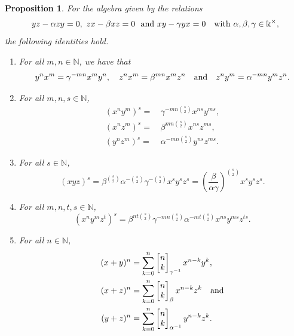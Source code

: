\documentclass{amsart}
\newtheorem{proposition}[theorem]{Proposition}
\theoremstyle{definition}
\theoremstyle{remark}
\numberwithin{equation}{section}
\begin{document}
\begin{proposition}\label{Case(1)}
For the algebra given by the relations
$$
yz - \alpha zy = 0,\ zx - \beta xz = 0\ \, \, {\rm and} \, \, xy - \gamma yx = 0 \quad {\rm with} \, \, \alpha, \beta, \gamma\in \Bbbk^{\times}, 
$$
the following identities hold.
\begin{enumerate}
\item [\rm (1)] For all $m, n\in\mathbb{N}$, we have that
\[
y^n x^m = \gamma^{-mn}x^m y^n, \quad
z^n x^m = \beta^{mn}x^m z^n \quad {\rm and} \quad z^n y^m = \alpha^{-mn}y^m z^n.
\]

\item[\rm (2)] For all $m,n,s\in\mathbb{N}$,
\begin{align*}
\left(x^n y^m\right)^s = &\, \gamma^{-mn\binom{s}{2}}x^{ns}y^{ms},\\
(x^n z^m)^s = &\, \beta^{mn\binom{s}{2}}x^{ns}z^{ms},\\
(y^n z^m)^s = &\, \alpha^{-mn\binom{s}{2}}y^{ns}z^{ms}.
\end{align*}

\item[\rm (3)] For all $s\in\mathbb{N}$,
\[
(xyz)^s = \beta^{\binom{s}{2}}\alpha^{-\binom{s}{2}}\gamma^{-\binom{s}{2}}x^s y^s z^s = \left(\frac{\beta} {\alpha\gamma}\right)^{\binom{s}{2}}x^s y^s z^s.
\]

\item[\rm (4)] For all $m, n , t, s\in\mathbb{N}$,
\[
\left(x^n y^m z^t\right)^s = \beta^{nt\binom{s}{2}}\gamma^{-mn\binom{s}{2}}\alpha^{-mt\binom{s}{2}}
x^{ns}y^{ms}z^{ts}.
\]

\item[\rm (5)] For all $n\in\mathbb{N}$,
\begin{align*}
(x+y)^n & =\sum_{k=0}^{n}\begin{bmatrix} n\\ k\end{bmatrix}_{\gamma^{-1}}x^{n-k}y^{k},\\
(x+z)^n & =\sum_{k=0}^{n}\begin{bmatrix} n\\ k\end{bmatrix}_{\beta}x^{n-k}z^{k} \quad {\rm and} \\
(y+z)^n & =\sum_{k=0}^{n}\begin{bmatrix} n\\ k\end{bmatrix}_{\alpha^{-1}}y^{n-k}z^{k}.
\end{align*}
\end{enumerate}
\end{proposition}
\end{document}
